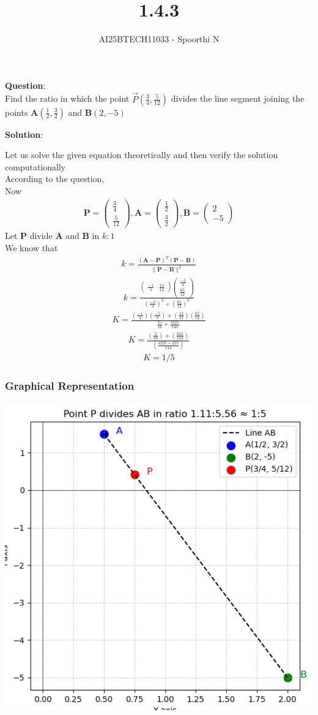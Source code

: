 \documentclass{beamer}
\title{1.4.3}
\author{AI25BTECH11033 - Spoorthi N}
\providecommand{\brak}[1]{\ensuremath{\left(#1\right)}}
\theoremstyle{remark}
\newcommand{\myvec}[1]{\ensuremath{\begin{pmatrix}#1\end{pmatrix}}}
\let\vec\mathbf
\numberwithin{equation}{section}
\begin{document}
{\let\newpage\relax\maketitle}
\renewcommand{\thefigure}{\theenumi}
\renewcommand{\thetable}{\theenumi}

\textbf{Question}:\\
\noindent Find the ratio in which the point $\Vec{P}\brak{\frac{3}{4},\frac{5}{12}} $ divides the line segment joining the points $\vec{A}\brak{\frac{1}{2},\frac{3}{2}}$ and $\vec{B}\brak{2,-5}$

\textbf{Solution}:

Let us solve the given equation theoretically and then verify the solution computationally \\
According to the question, \\
Now\\
\begin{align}
\vec{P}=\myvec{\frac{3}{4}\\ \frac{5}{12}},\vec{A}=\myvec{\frac{1}{2} \\ \frac{3}{2}},\vec{B}=\myvec{2\\-5}
\end{align}
Let $\vec{P}$ divide $\vec{A}$ and $\vec{B}$ in $k:1$ \\
We know that 
\begin{align}
	k= \frac{\vec{(A-P)}^T\vec{(P-B)}}{\|\vec{P-B}\|^2} 
   \end{align}
   \begin{align}
   k=\frac{\myvec{\frac{-1}{4} & \frac{13}{12}}\myvec{\frac{-5}{4} \\ \frac{65}{12}}}{(\frac{-5}{4})^2+(\frac{65}{12})^2} 
   \end{align}
   \begin{align}
       K=\frac{(\frac{-1}{4})(\frac{-5}{4})+(\frac{13}{12})(\frac{65}{12})}{\frac{25}{16}+\frac{4225}{144}}
 \end{align}
 \begin{align}
     K=\frac{(\frac{5}{16})+(\frac{845}{144})}{(\frac{4225+225}{144})}
 \end{align}
\begin{align}
    K=1/5
\end{align}
\begin{frame}
\frametitle{Graphical Representation}
    \centering
    \includegraphics[width=0.7\linewidth]{figs/fig1.png}
\end{frame}
\end{document}
